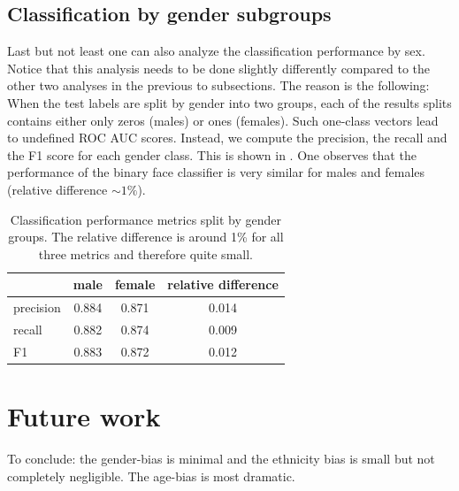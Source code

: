 \documentclass{article}
\begin{document}
\subsection{Classification by gender subgroups}
Last but not least one can also analyze the classification performance by sex. Notice that this analysis needs to be done slightly differently compared to the other two analyses in the previous to subsections. The reason is the following: When the test labels are split by gender into two groups, each of the results splits contains either only zeros (males) or ones (females). Such one-class vectors lead to undefined ROC AUC scores. Instead, we compute the precision, the recall and the F1 score for each gender class. This is shown in . One observes that the performance of the binary face classifier is very similar for males and females (relative difference $\sim1\%$).

\begin{table}[h!]
\begin{center}
\caption{Classification performance metrics split by gender groups. The relative difference is around 1\% for all three metrics and therefore quite small.}
\label{tab:gender_performance}
\begin{tabular}{| l | c | c | c |}
\hline\hline
& male & female & relative difference\\
\hline\hline
precision & 0.884 & 0.871 & 0.014 \\
recall & 0.882 & 0.874 & 0.009\\
F1 & 0.883 & 0.872 & 0.012\\
\hline\hline
\end{tabular}
\end{center}
\end{table}
\FloatBarrier
\section{Future work}
To conclude: the gender-bias is minimal and the ethnicity bias is small but not completely negligible. The age-bias is most dramatic.
\end{document}
